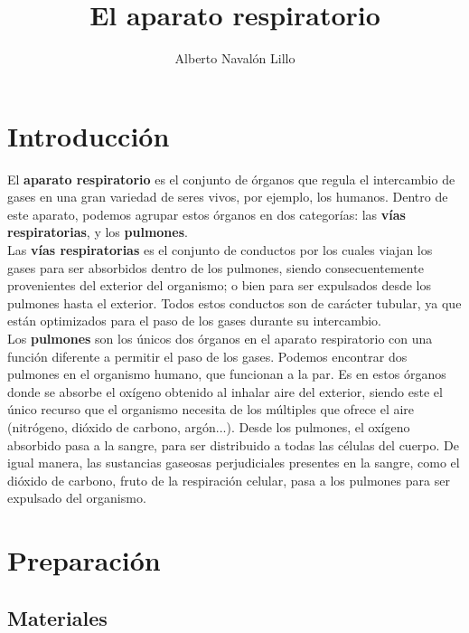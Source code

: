 \documentclass[12pt,a4paper]{article}
\title{\textbf{El aparato respiratorio}}
\author{Alberto Navalón Lillo}
\date{\displaydate{date}}
\begin{document}
\maketitle
\tableofcontents

\section*{Introducción}

El \textbf{aparato respiratorio} es el conjunto de órganos que regula el intercambio de gases en una gran variedad de seres vivos, por ejemplo, los humanos. Dentro de este aparato, podemos agrupar estos órganos en dos categorías: las \textbf{vías respiratorias}, y los \textbf{pulmones}.\\

Las \textbf{vías respiratorias} es el conjunto de conductos por los cuales viajan los gases para ser absorbidos dentro de los pulmones, siendo consecuentemente provenientes del exterior del organismo; o bien para ser expulsados desde los pulmones hasta el exterior. Todos estos conductos son de carácter tubular, ya que están optimizados para el paso de los gases durante su intercambio.\\

Los \textbf{pulmones} son los únicos dos órganos en el aparato respiratorio con una función diferente a permitir el paso de los gases. Podemos encontrar dos pulmones en el organismo humano, que funcionan a la par. Es en estos órganos donde se absorbe el oxígeno obtenido al inhalar aire del exterior, siendo este el único recurso que el organismo necesita de los múltiples que ofrece el aire (nitrógeno, dióxido de carbono, argón...). Desde los pulmones, el oxígeno absorbido pasa a la sangre, para ser distribuido a todas las células del cuerpo. De igual manera, las sustancias gaseosas perjudiciales presentes en la sangre, como el dióxido de carbono, fruto de la respiración celular, pasa a los pulmones para ser expulsado del organismo.

\section{Preparación}

\subsection{Materiales}
\end{document}
